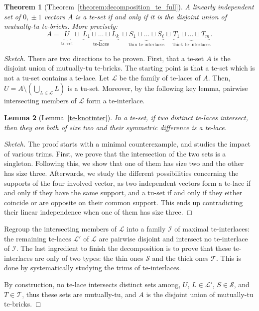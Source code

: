 \documentclass[11pt,a4paper]{amsart}
\theoremstyle{plain}
\newtheorem{theorem}{Theorem}[section]%
\newtheorem{lemma}[theorem]{Lemma}
\theoremstyle{definition}
\newcommand{\cal}[1]{\mathcal{#1}}
\renewcommand{\cal}[1]{\mathcal{#1}}
\begin{document}
\begin{theorem}[Theorem~\ref{theorem:decomposition_te_full}]\label{theorem:decomposition_te}
	A linearly independent set of $0,\!\pm1$ vectors $A$ is a te-set if and only if it is the disjoint union of mutually-tu te-bricks. More precisely:
	$$A = \underbrace{U_{}}_{\text{tu-set}} \sqcup~\underbrace{L_1\sqcup \dots \sqcup L_k}_{\text{te-laces}}~\sqcup \underbrace{S_1\sqcup \dots\sqcup S_\ell}_{\text{thin te-interlaces}}\sqcup \underbrace{T_1\sqcup \dots\sqcup T_m}_{\text{thick te-interlaces}}\!\!.$$
\end{theorem}
\begin{proof}[Sketch]
	There are two directions to be proven.
	First, that a te-set $A$ is the disjoint union of mutually-tu te-bricks.
	The starting point is that a te-set which is not a tu-set contains a te-lace.
	Let $\cal L$ be the family of te-laces of $A$.
	Then, $U=A\setminus (\bigcup_{L\in\cal L} L)$ is a tu-set.
	Moreover, by the following key lemma, pairwise intersecting members of $\cal L$ form a te-interlace.
	\begin{lemma}[Lemma~\ref{te-knotinter}]\label{keylemma}
		In a te-set, if two distinct te-laces intersect, then they are both of size two and their symmetric difference is a te-lace.
	\end{lemma}
	\begin{proof}[Sketch]%
		The proof starts with a minimal counterexample, and studies the impact of various trims.
		First, we prove that the intersection of the two sets is a singleton. 
		Following this, we show that one of them has size two and the other has size three.
		Afterwards, we study the different possibilities concerning the supports of the four involved vector, as two independent vectors form a te-lace if and only if they have the same support, and a tu-set if and only if they either coincide or are opposite on their common support.
		This ends up contradicting their linear independence when one of them has size three.
		\end{proof}
	Regroup the intersecting members of $\cal L$ into a family $\cal I$ of maximal te-interlaces: the remaining te-laces $\cal L'$ of $\cal L$ are pairwise disjoint and intersect no te-interlace of $\cal I$. 
	The last ingredient to finish the decomposition is to prove that these te-interlaces are only of two types: the thin ones $\cal S$ and the thick ones $\cal T$.
	This is done by systematically studying the trims of te-interlaces.
	
	By construction, no te-lace intersects distinct sets among, $U$, $L\in\cal L'$, $S\in \cal S$, and $T\in \cal T$, thus these sets are mutually-tu, and $A$ is the disjoint union of mutually-tu te-bricks.
	

\end{proof}
\end{document}
